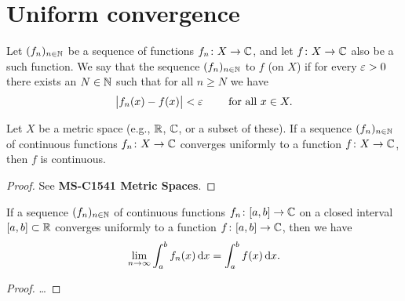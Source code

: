 \section{Uniform convergence}

\begin{definition}
  \label{def:uniform_limit}
  Let $(f_n)_{n \in \mathbb{N}}$ be a sequence of functions
  $f_n \colon X \to \mathbb{C}$, and let $f \colon X \to \mathbb{C}$
  also be a such function. We say that the sequence
  $(f_n)_{n \in \mathbb{N}}$  to $f$
  (on $X$) if for every $\varepsilon > 0$ there exists an $N \in \mathbb{N}$
  such that for all $n \ge N$ we have
  \begin{align*}
    \big| f_n(x) - f(x) \big| < \varepsilon
    \qquad \text{ for all } x \in X .
  \end{align*}
\end{definition}

\begin{lemma}
  \label{lem:uniform_limit_continuous}
  Let $X$ be a metric space (e.g., $\mathbb{R}$, $\mathbb{C}$, or a subset of these).
  If a sequence $(f_n)_{n \in \mathbb{N}}$ of continuous functions
  $f_n \colon X \to \mathbb{C}$ converges uniformly to a function
  $f \colon X \to \mathbb{C}$, then $f$ is continuous.
\end{lemma}
\begin{proof}
  See \textbf{MS-C1541 Metric Spaces}.
\end{proof}

\begin{lemma}
  \label{lem:uniform_limit_integral}
  If a sequence $(f_n)_{n \in \mathbb{N}}$ of continuous functions
  $f_n \colon [a,b] \to \mathbb{C}$ on a closed interval $[a,b] \subset \mathbb{R}$
  converges uniformly to a function
  $f \colon [a,b] \to \mathbb{C}$, then we have
  \begin{align*}
    \lim_{n \to \infty} \int_a^b f_n(x) \, \mathrm{d} x
      = \int_a^b f(x) \, \mathrm{d} x .
  \end{align*}
\end{lemma}
\begin{proof}
  \ldots
\end{proof}

